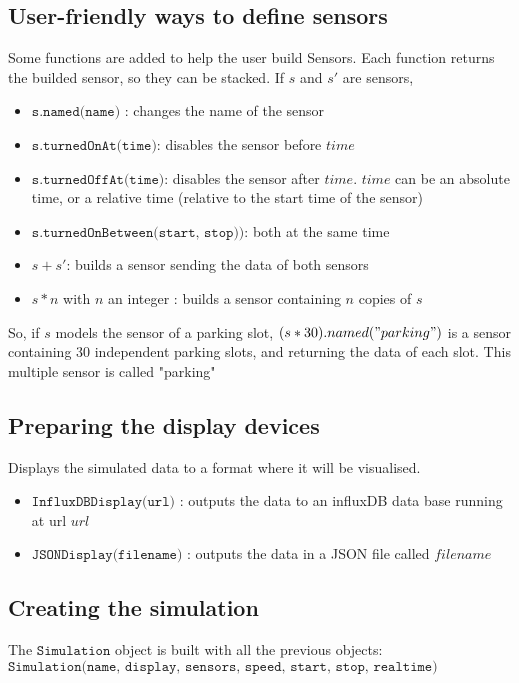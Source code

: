 \subsection{User-friendly ways to define sensors}

Some functions are added to help the user build Sensors. Each function returns
the builded sensor, so they can be stacked.
If $s$ and $s'$ are sensors,
\begin{itemize}
    \item $\texttt{s.named(name)}$ : changes the name of the sensor
    \item $\texttt{s.turnedOnAt(time)}$: disables the sensor before $time$
    \item $\texttt{s.turnedOffAt(time)}$: disables the sensor after $time$.
$time$ can be an absolute time, or a relative time (relative to the start time
of the sensor)
    \item $\texttt{s.turnedOnBetween(start, stop))}$: both at the same time
    \item $s + s'$: builds a sensor sending the data of both sensors
    \item $s * n$ with $n$ an integer : builds a sensor containing $n$ copies
of $s$
\end{itemize}

So, if $s$ models the sensor of a parking slot, $(s*30).named("parking")$ is a
sensor containing 30 independent parking slots, and returning the data of each
slot. This multiple sensor is called "parking"

\subsection{Preparing the display devices}
Displays the simulated data to a format where it will be visualised.

\begin{itemize}
    \item $\texttt{InfluxDBDisplay(url)}$ : outputs the data to an influxDB data
base running at url $url$
    \item $\texttt{JSONDisplay(filename)}$ : outputs the data in a JSON file
called $filename$
\end{itemize}


\subsection{Creating the simulation}
The $\texttt{Simulation}$ object is built with all the previous objects:
$\texttt{Simulation(name, display, sensors, speed, start, stop, realtime)}$

